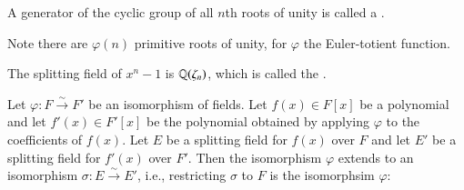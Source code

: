 \begin{definition}
    A generator of the cyclic group of all $n$th roots of unity is called a .
\end{definition}

Note there are $\varphi(n)$ primitive roots of unity, for $\varphi$ the Euler-totient function. 

\begin{definition}
    The splitting field of $x^n-1$ is $\mathbb Q(\zeta_n)$, which is called the .
\end{definition}


\begin{theorem}
    Let $\varphi:F\xrightarrow{\sim}F'$ be an isomorphism of fields. Let $f(x) \in F[x]$ be a polynomial and let $f'(x) \in F'[x]$ be the polynomial obtained by applying $\varphi$ to the coefficients of $f(x)$. Let $E$ be a splitting field for $f(x)$ over $F$ and let $E'$ be a splitting field for $f'(x)$ over $F'$. Then the isomorphism $\varphi$ extends to an isomorphism $\sigma:E\xrightarrow{\sim}E'$, i.e., restricting $\sigma$ to $F$ is the isomorphsim $\varphi$:
    \begin{center}
    \end{center}
\end{theorem}
